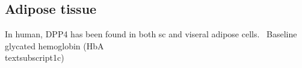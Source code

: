 \subsection{Adipose tissue}
In human, DPP4 has been found in both sc and viseral adipose cells.~\cite{Lamers2011} Baseline glycated hemoglobin (HbA\\textsubscript{1c}) 